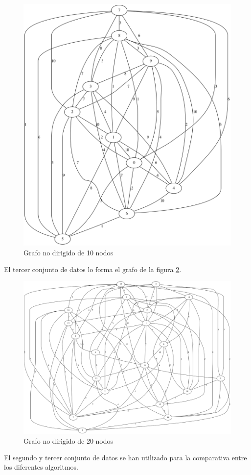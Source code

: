 \begin{figure}[h]
	\centering
	\includegraphics[scale=0.3]{../dataset/90_10_dataset}
	\vspace{1mm}
	\caption{Grafo no dirigido de 10 nodos}
	\label{grafo_2}
\end{figure}

El tercer conjunto de datos lo forma el grafo de la figura \ref{grafo_3}.

\begin{figure}[h]
	\centering
	\includegraphics[scale=0.2]{../dataset/95_20_dataset}
	\vspace{1mm}
	\caption{Grafo no dirigido de 20 nodos}
	\label{grafo_3}
\end{figure}

El segundo y tercer conjunto de datos se han utilizado para la comparativa entre los diferentes algoritmos.

